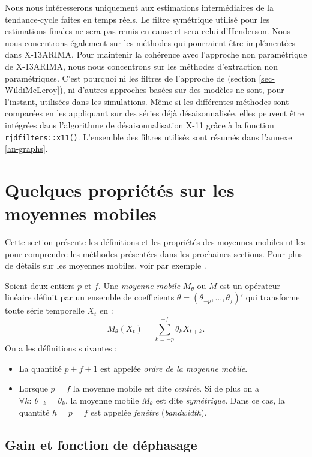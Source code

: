 \documentclass[
  12pt,
  french,
  12pt,a4paper]{article}
\newcommand\1{\mathds{1}}
\begin{document}
Nous nous intéresserons uniquement aux estimations intermédiaires de la tendance-cycle faites en temps réels.
Le filtre symétrique utilisé pour les estimations finales ne sera pas remis en cause et sera celui d'Henderson.
Nous nous concentrons également sur les méthodes qui pourraient être implémentées dans X-13ARIMA.
Pour maintenir la cohérence avec l'approche non paramétrique de X-13ARIMA, nous nous concentrons sur les méthodes d'extraction non paramétriques.
C'est pourquoi ni les filtres de l'approche de \textcite{trilemmaWMR2019} (section \ref{sec-WildiMcLeroy}), ni d'autres approches basées sur des modèles ne sont, pour l'instant, utilisées dans les simulations.
Même si les différentes méthodes sont comparées en les appliquant sur des séries déjà désaisonnalisée, elles peuvent être intégrées dans l'algorithme de désaisonnalisation X-11 grâce à la fonction \texttt{rjdfilters::x11()}.
L'ensemble des filtres utilisés sont résumés dans l'annexe \ref{an-graphs}.

\hypertarget{sec-propMM}{%
\section{Quelques propriétés sur les moyennes mobiles}\label{sec-propMM}}

Cette section présente les définitions et les propriétés des moyennes mobiles utiles pour comprendre les méthodes présentées dans les prochaines sections. Pour plus de détails sur les moyennes mobiles, voir par exemple \textcite{ch12HBSA}.

Soient deux entiers \(p\) et \(f\).
Une \emph{moyenne mobile} \(M_\theta\) ou \(M\) est un opérateur linéaire définit par un ensemble de coefficients \(\theta=(\theta_{-p},\dots,\theta_{f})'\) qui transforme toute série temporelle \(X_t\) en :
\[
M_\theta(X_t)=\sum_{k=-p}^{+f}\theta_kX_{t+k}.
\]
On a les définitions suivantes :

\begin{itemize}
\item
  La quantité \(p+f+1\) est appelée \emph{ordre de la moyenne mobile}.
\item
  Lorsque \(p=f\) la moyenne mobile est dite \emph{centrée}.
  Si de plus on a \(\forall k:\:\theta_{-k} = \theta_k\), la moyenne mobile \(M_\theta\) est dite \emph{symétrique}.
  Dans ce cas, la quantité \(h=p=f\) est appelée \emph{fenêtre} (\emph{bandwidth}).
\end{itemize}

\hypertarget{gain-et-fonction-de-duxe9phasage}{%
\subsection{Gain et fonction de déphasage}\label{gain-et-fonction-de-duxe9phasage}}
\end{document}
